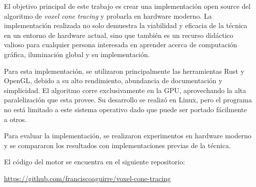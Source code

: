 \documentclass{prgrado}
\begin{document}
El objetivo principal de este trabajo es crear una implementación open source del algoritmo de \textit{voxel cone tracing} y probarla en hardware moderno. La implementación realizada no solo demuestra la viabilidad y eficacia de la técnica en un entorno de hardware actual, sino que también es un recurso didáctico valioso para cualquier persona interesada en aprender acerca de computación gráfica, iluminación global y su implementación.

Para esta implementación, se utilizaron principalmente las herramientas Rust y OpenGL, debido a su alto rendimiento, abundancia de documentación y simplicidad.
El algoritmo corre exclusivamente en la GPU, aprovechando la alta paralelización que esta provee.
Su desarrollo se realizó en Linux, pero el programa no está limitado a este sistema operativo dado que puede ser portado fácilmente a otros.

Para evaluar la implementación, se realizaron experimentos en hardware moderno y se compararon los resultados con implementaciones previas de la técnica.

El código del motor se encuentra en el siguiente repositorio:

\url{https://github.com/franciscoaguirre/voxel-cone-tracing}

\hfill \break
{}


\tableofcontents
\newpage



\mainmatter %













\backmatter %


\newpage

\printbibliography



\begin{appendix}



\end{appendix}

\end{document}
